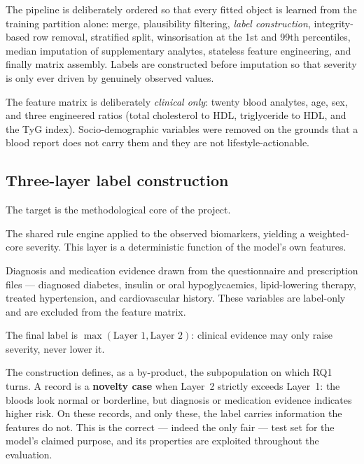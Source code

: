 \documentclass[11pt,a4paper]{article}
\begin{document}
The pipeline is deliberately ordered so that every fitted object is learned from
the training partition alone: merge, plausibility filtering, \emph{label
construction}, integrity-based row removal, stratified split, winsorisation at the
1st and 99th percentiles, median imputation of supplementary analytes, stateless
feature engineering, and finally matrix assembly. Labels are constructed before
imputation so that severity is only ever driven by genuinely observed values.

The feature matrix is deliberately \emph{clinical only}: twenty blood analytes,
age, sex, and three engineered ratios (total cholesterol to HDL, triglyceride to
HDL, and the TyG index). Socio-demographic variables were removed on the grounds
that a blood report does not carry them and they are not lifestyle-actionable.

\subsection{Three-layer label construction}

The target is the methodological core of the project.

\begin{description}[leftmargin=1.4cm,style=nextline]
  \item[Layer 1] The shared rule engine applied to the observed biomarkers, yielding
    a weighted-core severity. This layer is a deterministic function of the model's
    own features.
  \item[Layer 2] Diagnosis and medication evidence drawn from the questionnaire and
    prescription files --- diagnosed diabetes, insulin or oral hypoglycaemics,
    lipid-lowering therapy, treated hypertension, and cardiovascular history. These
    variables are label-only and are excluded from the feature matrix.
  \item[Layer 3] The final label is $\max(\text{Layer 1}, \text{Layer 2})$: clinical
    evidence may only raise severity, never lower it.
\end{description}

The construction defines, as a by-product, the subpopulation on which RQ1 turns.
A record is a \textbf{novelty case} when Layer~2 strictly exceeds Layer~1: the
bloods look normal or borderline, but diagnosis or medication evidence indicates
higher risk. On these records, and only these, the label carries information the
features do not. This is the correct --- indeed the only fair --- test set for the
model's claimed purpose, and its properties are exploited throughout the evaluation.
\end{document}
